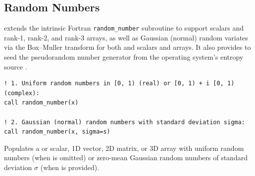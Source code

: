 \subsection{Random Numbers}
\label{subsec:random_numbers}

 extends the intrinsic Fortran \texttt{random\_number} subroutine to support  scalars and rank-1, rank-2, and rank-3 arrays, as well as Gaussian (normal) random variates via the Box--Muller transform for both  and  scalars and arrays. It also provides  to seed the pseudorandom number generator from the operating system's entropy source .


\lstset{language=[95]Fortran}
\begin{lstlisting}
! 1. Uniform random numbers in [0, 1) (real) or [0, 1) + i [0, 1) (complex):
call random_number(x)

! 2. Gaussian (normal) random numbers with standard deviation sigma:
call random_number(x, sigma=s)
\end{lstlisting}

Populates a  or  scalar, 1D vector, 2D matrix, or 3D array  with uniform random numbers (when  is omitted) or zero-mean Gaussian random numbers of standard deviation $\sigma$ (when  is provided).

